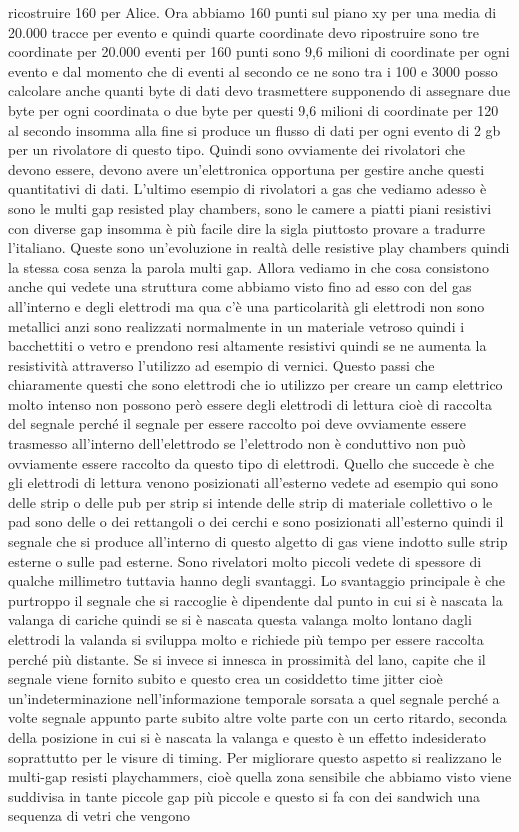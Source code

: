 {ricostruire 160 per Alice. Ora abbiamo 160 punti sul piano xy per una media di 20.000 tracce per evento e quindi quarte coordinate devo ripostruire sono tre coordinate per 20.000 eventi per 160 punti sono 9,6 milioni di coordinate per ogni evento e dal momento che di eventi al secondo ce ne sono tra i 100 e 3000 posso calcolare anche quanti byte di dati devo trasmettere supponendo di assegnare due byte per ogni coordinata o due byte per questi 9,6 milioni di coordinate per 120 al secondo insomma alla fine si produce un flusso di dati per ogni evento di 2 gb per un rivolatore di questo tipo. Quindi sono ovviamente dei rivolatori che devono essere, devono avere un'elettronica opportuna per gestire anche questi quantitativi di dati. L'ultimo esempio di rivolatori a gas che vediamo adesso è sono le multi gap resisted play chambers, sono le camere a piatti piani resistivi con diverse gap insomma è più facile dire la sigla piuttosto provare a tradurre l'italiano. Queste sono un'evoluzione in realtà delle resistive play chambers quindi la stessa cosa senza la parola multi gap. Allora vediamo in che cosa consistono anche qui vedete una struttura come abbiamo visto fino ad esso con del gas all'interno e degli elettrodi ma qua c'è una particolarità gli elettrodi non sono metallici anzi sono realizzati normalmente in un materiale vetroso quindi i bacchettiti o vetro e prendono resi altamente resistivi quindi se ne aumenta la resistività attraverso l'utilizzo ad esempio di vernici. Questo passi che chiaramente questi che sono elettrodi che io utilizzo per creare un camp elettrico molto intenso non possono però essere degli elettrodi di lettura cioè di raccolta del segnale perché il segnale per essere raccolto poi deve ovviamente essere trasmesso all'interno dell'elettrodo se l'elettrodo non è conduttivo non può ovviamente essere raccolto da questo tipo di elettrodi. Quello che succede è che gli elettrodi di lettura venono posizionati all'esterno vedete ad esempio qui sono delle strip o delle pub per strip si intende delle strip di materiale collettivo o le pad sono delle o dei rettangoli o dei cerchi e sono posizionati all'esterno quindi il segnale che si produce all'interno di questo algetto di gas viene indotto sulle strip esterne o sulle pad esterne. Sono rivelatori molto piccoli vedete di spessore di qualche millimetro tuttavia hanno degli svantaggi. Lo svantaggio principale è che purtroppo il segnale che si raccoglie è dipendente dal punto in cui si è nascata la valanga di cariche quindi se si è nascata questa valanga molto lontano dagli elettrodi la valanda si sviluppa molto e richiede più tempo per essere raccolta perché più distante. Se si invece si innesca in prossimità del lano, capite che il segnale viene fornito subito e questo crea un cosiddetto time jitter cioè un'indeterminazione nell'informazione temporale sorsata a quel segnale perché a volte segnale appunto parte subito altre volte parte con un certo ritardo, seconda della posizione in cui si è nascata la valanga e questo è un effetto indesiderato soprattutto per le visure di timing. Per migliorare questo aspetto si realizzano le multi-gap resisti playchammers, cioè quella zona sensibile che abbiamo visto viene suddivisa in tante piccole gap più piccole e questo si fa con dei sandwich una sequenza di vetri che vengono }
